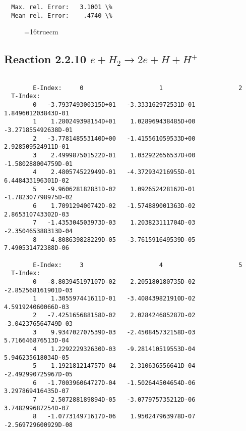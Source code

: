\documentclass[12pt,dvipdfmx]{article}
\begin{document}
\begin{small}
\begin{verbatim}
  Max. rel. Error:   3.1001 \%
  Mean rel. Error:    .4740 \%

\end{verbatim}\end{small}
\begin{figure} \label{2.2.9}
\epsfxsize=16truecm
\end{figure}
\newpage

\subsection{
Reaction 2.2.10  $ e + H_2  \rightarrow 2e + H + H^+  $ }

\begin{small}\begin{verbatim}

        E-Index:     0                     1                     2
  T-Index:
        0   -3.793749300315D+01   -3.333162972531D-01    1.849601203843D-01
        1    1.280249398154D+01    1.028969438485D+00   -3.271855492638D-01
        2   -3.778148553140D+00   -1.415561059533D+00    2.928509524911D-01
        3    2.499987501522D-01    1.032922656537D+00   -1.580288004759D-01
        4    2.480574522949D-01   -4.372934216955D-01    6.448433196301D-02
        5   -9.960628182831D-02    1.092652428162D-01   -1.782307798975D-02
        6    1.709129400742D-02   -1.574889001363D-02    2.865310743302D-03
        7   -1.435304503973D-03    1.203823111704D-03   -2.350465388313D-04
        8    4.808639828229D-05   -3.761591649539D-05    7.490531472388D-06

        E-Index:     3                     4                     5
  T-Index:
        0   -8.803945197107D-02    2.205180180735D-02   -2.852568161901D-03
        1    1.305597441611D-01   -3.408439821910D-02    4.591924060066D-03
        2   -7.425165688158D-02    2.028424685287D-02   -3.042376564749D-03
        3    9.934702707539D-03   -2.450845732158D-03    5.716646876513D-04
        4    1.229222932630D-03   -9.281410519553D-04    5.946235618034D-05
        5    1.192181214757D-04    2.310636556641D-04   -2.492990725967D-05
        6   -1.700396064727D-04   -1.502644504654D-06    3.297869416435D-07
        7    2.507288189894D-05   -3.077975735212D-06    3.748299687254D-07
        8   -1.077314971617D-06    1.950247963978D-07   -2.569729600929D-08


\end{verbatim}
\end{small}
\end{document}
